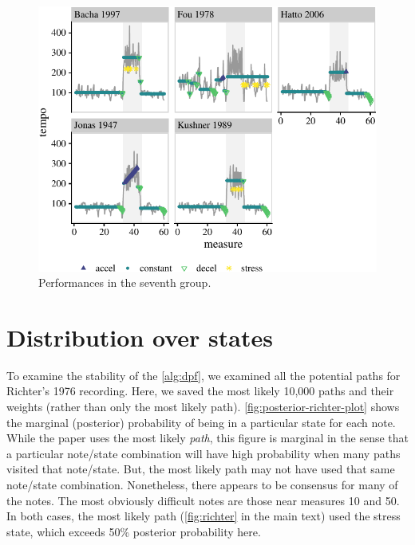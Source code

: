 \documentclass[aoas]{imsart}
\begin{document}
\begin{figure}

{\centering \includegraphics{gfx/clust-7-1} 

}

\caption{Performances in the seventh group.}\label{fig:clust-7}
\end{figure}

\hypertarget{distribution-over-states}{%
\section{Distribution over states}\label{distribution-over-states}}

To examine the stability of the \autoref{alg:dpf}, we examined all the
potential paths for Richter's 1976 recording. Here, we saved the most
likely 10,000 paths and their weights (rather than only the most likely
path). \autoref{fig:posterior-richter-plot} shows the marginal
(posterior) probability of being in a particular state for each note.
While the paper uses the most likely \emph{path}, this figure is
marginal in the sense that a particular note/state combination will have
high probability when many paths visited that note/state. But, the most
likely path may not have used that same note/state combination.
Nonetheless, there appears to be consensus for many of the notes. The
most obviously difficult notes are those near measures 10 and 50. In
both cases, the most likely path (\autoref{fig:richter} in the main
text) used the stress state, which exceeds 50\% posterior probability
here.
\end{document}
